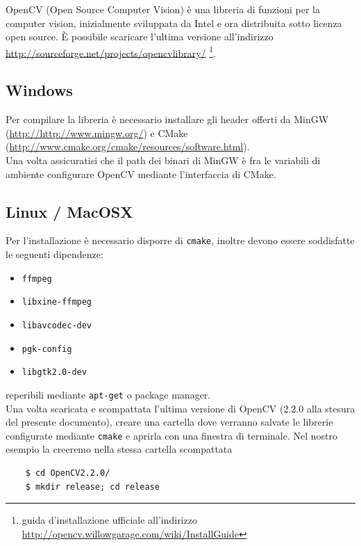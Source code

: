 \documentclass[12pt]{report}
\begin{document}
OpenCV (Open Source Computer Vision) \`e una libreria di funzioni per la computer vision, inizialmente sviluppata da Intel e ora distribuita sotto licenza open source. \`E possibile scaricare l'ultima versione all'indirizzo \url{http://sourceforge.net/projects/opencvlibrary/} \footnote{guida d'installazione ufficiale all'indirizzo \url{http://opencv.willowgarage.com/wiki/InstallGuide}}.

\subsection{Windows}

Per compilare la libreria \`e necessario installare gli header offerti da MinGW (\url{http://http://www.mingw.org/}) e CMake (\url{http://www.cmake.org/cmake/resources/software.html}).\\
\noindent Una volta assicuratisi che il path dei binari di MinGW \`e fra le variabili di ambiente configurare OpenCV mediante l'interfaccia di CMake.

\subsection{Linux / MacOSX}

\noindent Per l'installazione \`e necessario disporre di \verb|cmake|, inoltre devono essere soddisfatte le seguenti dipendenze:
\begin{itemize}
\item \verb|ffmpeg|
\item \verb|libxine-ffmpeg|
\item \verb|libavcodec-dev|
\item \verb|pgk-config|
\item \verb|libgtk2.0-dev|
\end{itemize}

\noindent reperibili mediante \verb|apt-get| o package manager.\\

\noindent Una volta scaricata e scompattata l'ultima versione di OpenCV (2.2.0 alla stesura del presente documento), creare una cartella dove verranno salvate le librerie configurate mediante \verb|cmake| e aprirla con una finestra di terminale. Nel nostro esempio la creeremo nella stessa cartella scompattata

\begin{verbatim}
	$ cd OpenCV2.2.0/
	$ mkdir release; cd release
\end{verbatim}
\end{document}
